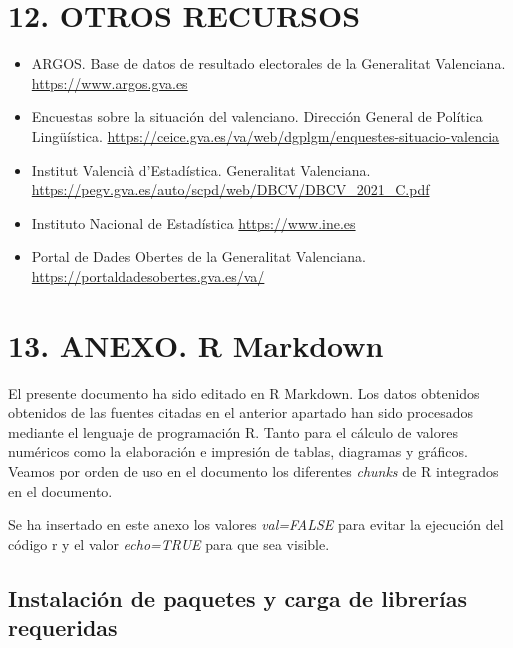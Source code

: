 \documentclass[
]{article}
\providecommand{\tightlist}{%
  \setlength{\itemsep}{0pt}\setlength{\parskip}{0pt}}
\begin{document}
\hypertarget{otros-recursos}{%
\section{12. OTROS RECURSOS}\label{otros-recursos}}

\begin{itemize}
\tightlist
\item
  ARGOS. Base de datos de resultado electorales de la Generalitat
  Valenciana. \url{https://www.argos.gva.es}
\item
  Encuestas sobre la situación del valenciano. Dirección General de
  Política Lingüística.
  \url{https://ceice.gva.es/va/web/dgplgm/enquestes-situacio-valencia}
\item
  Institut Valencià d'Estadística. Generalitat Valenciana.
  \url{https://pegv.gva.es/auto/scpd/web/DBCV/DBCV_2021_C.pdf}
\item
  Instituto Nacional de Estadística \url{https://www.ine.es}
\item
  Portal de Dades Obertes de la Generalitat Valenciana.
  \url{https://portaldadesobertes.gva.es/va/}
\end{itemize}

\hypertarget{anexo.-r-markdown}{%
\section{13. ANEXO. R Markdown}\label{anexo.-r-markdown}}

El presente documento ha sido editado en R Markdown. Los datos obtenidos
obtenidos de las fuentes citadas en el anterior apartado han sido
procesados mediante el lenguaje de programación R. Tanto para el cálculo
de valores numéricos como la elaboración e impresión de tablas,
diagramas y gráficos. Veamos por orden de uso en el documento los
diferentes \emph{chunks} de R integrados en el documento.

Se ha insertado en este anexo los valores \emph{val=FALSE} para evitar
la ejecución del código r y el valor \emph{echo=TRUE} para que sea
visible.

\hypertarget{instalaciuxf3n-de-paquetes-y-carga-de-libreruxedas-requeridas}{%
\subsection{Instalación de paquetes y carga de librerías
requeridas}\label{instalaciuxf3n-de-paquetes-y-carga-de-libreruxedas-requeridas}}
\end{document}
